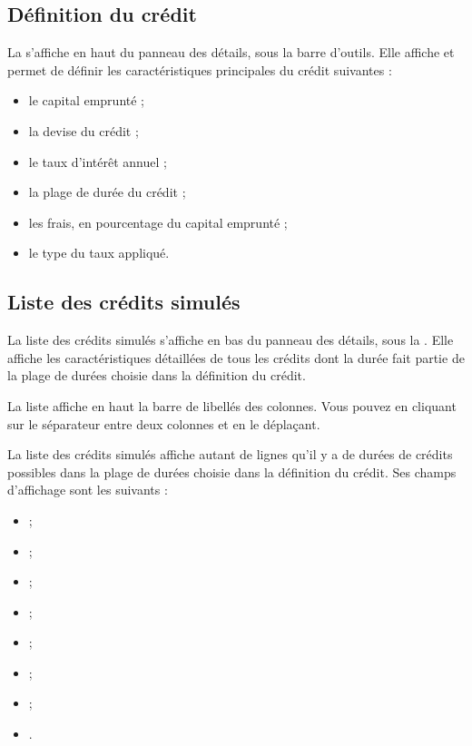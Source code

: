 \subsection{Définition du crédit\label{credit-simulation-definition}}

La  s'affiche en haut du panneau des détails, sous la barre d'outils. Elle affiche et permet de définir les caractéristiques principales du crédit suivantes :

\begin{itemize}
	 \item le capital emprunté ; 
	 \item la devise du crédit ;
	 \item le taux d'intérêt annuel ;
	 \item la plage de durée du crédit ;
	 \item les frais, en pourcentage du capital emprunté ;
	 \item le type du taux appliqué.
\end{itemize}


\subsection{Liste des crédits simulés\label{credit-simulation-list}}

La liste des crédits simulés s'affiche en bas du panneau des détails, sous la  . Elle affiche les caractéristiques détaillées de tous les crédits dont la durée fait partie de la plage de durées choisie dans la définition du crédit. 

La liste affiche en haut la barre de libellés des colonnes. Vous pouvez  en cliquant sur le séparateur entre deux colonnes et en le déplaçant. 


La liste des crédits simulés affiche autant de lignes qu'il y a de durées de crédits possibles dans la plage de durées choisie dans la définition du crédit. Ses champs d'affichage sont les suivants :

\begin{itemize}
	 \item {} ;
	 \item {} ;
	 \item {} ;
	 \item {} ;
	 \item {} ;
	 \item {} ;
	 \item {} ;
	 \item {}.
\end{itemize}

